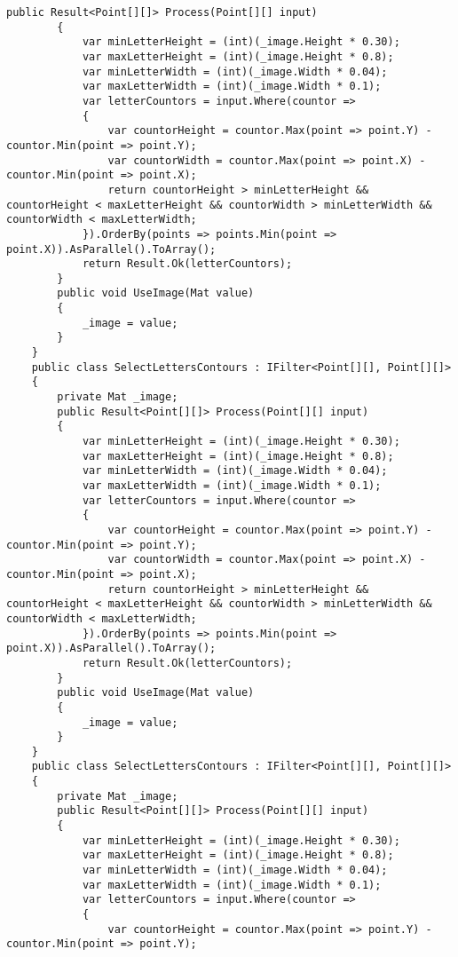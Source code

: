 \begin{lstlisting}[style=fsharpstyle,caption={Исходный код}, label=lst:recognition_result_handler]
        public Result<Point[][]> Process(Point[][] input)
        {
            var minLetterHeight = (int)(_image.Height * 0.30);
            var maxLetterHeight = (int)(_image.Height * 0.8);
            var minLetterWidth = (int)(_image.Width * 0.04);
            var maxLetterWidth = (int)(_image.Width * 0.1);
            var letterCountors = input.Where(countor =>
            {
                var countorHeight = countor.Max(point => point.Y) - countor.Min(point => point.Y);
                var countorWidth = countor.Max(point => point.X) - countor.Min(point => point.X);
                return countorHeight > minLetterHeight && countorHeight < maxLetterHeight && countorWidth > minLetterWidth && countorWidth < maxLetterWidth;
            }).OrderBy(points => points.Min(point => point.X)).AsParallel().ToArray();
            return Result.Ok(letterCountors);
        }
        public void UseImage(Mat value)
        {
            _image = value;
        }
    }
    public class SelectLettersContours : IFilter<Point[][], Point[][]>
    {
        private Mat _image;
        public Result<Point[][]> Process(Point[][] input)
        {
            var minLetterHeight = (int)(_image.Height * 0.30);
            var maxLetterHeight = (int)(_image.Height * 0.8);
            var minLetterWidth = (int)(_image.Width * 0.04);
            var maxLetterWidth = (int)(_image.Width * 0.1);
            var letterCountors = input.Where(countor =>
            {
                var countorHeight = countor.Max(point => point.Y) - countor.Min(point => point.Y);
                var countorWidth = countor.Max(point => point.X) - countor.Min(point => point.X);
                return countorHeight > minLetterHeight && countorHeight < maxLetterHeight && countorWidth > minLetterWidth && countorWidth < maxLetterWidth;
            }).OrderBy(points => points.Min(point => point.X)).AsParallel().ToArray();
            return Result.Ok(letterCountors);
        }
        public void UseImage(Mat value)
        {
            _image = value;
        }
    }
    public class SelectLettersContours : IFilter<Point[][], Point[][]>
    {
        private Mat _image;
        public Result<Point[][]> Process(Point[][] input)
        {
            var minLetterHeight = (int)(_image.Height * 0.30);
            var maxLetterHeight = (int)(_image.Height * 0.8);
            var minLetterWidth = (int)(_image.Width * 0.04);
            var maxLetterWidth = (int)(_image.Width * 0.1);
            var letterCountors = input.Where(countor =>
            {
                var countorHeight = countor.Max(point => point.Y) - countor.Min(point => point.Y);

\end{lstlisting}
